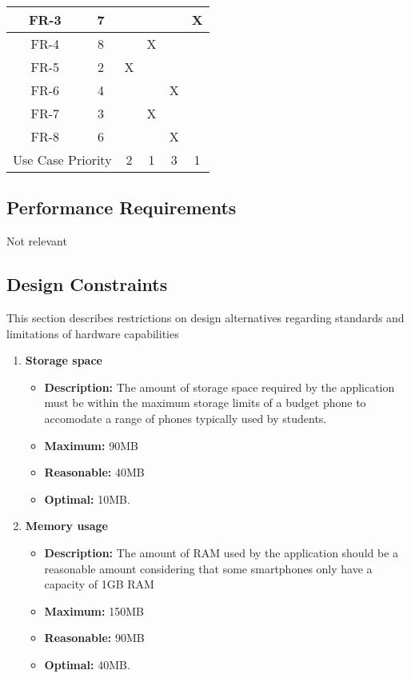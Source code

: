 \documentclass{article}
\begin{document}
\begin{enumerate}
\begin{table}[]
\begin{tabular}{cc|c|c|c|c|}
\multicolumn{1}{|c|}{FR-3}        & 7        &        &       &       & X     \\ \hline
\multicolumn{1}{|c|}{FR-4}        & 8        &        & X     &       &       \\ \hline
\multicolumn{1}{|c|}{FR-5}        & 2        & X      &       &       &       \\ \hline
\multicolumn{1}{|c|}{FR-6}        & 4        &        &       & X     &       \\ \hline
\multicolumn{1}{|c|}{FR-7}        & 3        &        & X     &       &       \\ \hline
\multicolumn{1}{|c|}{FR-8}        & 6        &        &       & X     &       \\ \hline
\multicolumn{2}{|c|}{Use Case Priority}      & 2      & 1     & 3     & 1     \\ \hline
\end{tabular}
\end{table}
	\end{enumerate}
	
	
	\subsection{Performance Requirements}
	Not relevant
	
	\subsection{Design Constraints}
	This section describes restrictions on design alternatives regarding standards and limitations of hardware capabilities
	\begin{enumerate}
		\item \textbf{Storage space}
		\begin{itemize}
			\item \textbf{Description:} The amount of storage space required by the application must be within the maximum storage limits of a budget phone to accomodate a range of phones typically used by students.
			\item \textbf{Maximum:} 90MB
			\item \textbf{Reasonable:} 40MB
			\item \textbf{Optimal:} 10MB.\newline
		\end{itemize}
	
		\item \textbf{Memory usage}
		\begin{itemize}
			\item \textbf{Description:} The amount of RAM used by the application should be a reasonable amount considering that some smartphones only have a capacity of 1GB RAM
			\item \textbf{Maximum:} 150MB
			\item \textbf{Reasonable:} 90MB
			\item \textbf{Optimal:} 40MB.\newline
		\end{itemize}
	\end{enumerate}
	
\end{document}
